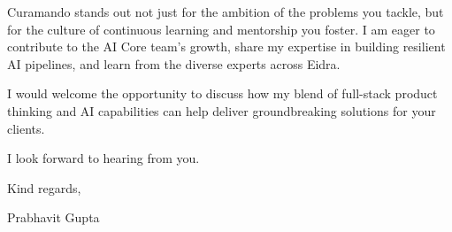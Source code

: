\documentclass[11pt,a4paper]{article}
\begin{document}
\noindent Curamando stands out not just for the ambition of the problems you tackle, but for the culture of continuous learning and mentorship you foster. I am eager to contribute to the AI Core team's growth, share my expertise in building resilient AI pipelines, and learn from the diverse experts across Eidra.

\noindent I would welcome the opportunity to discuss how my blend of full-stack product thinking and AI capabilities can help deliver groundbreaking solutions for your clients.

\noindent I look forward to hearing from you.

\vspace{10pt}

\noindent Kind regards,

\vspace{10pt}

\noindent Prabhavit Gupta
\end{document}
